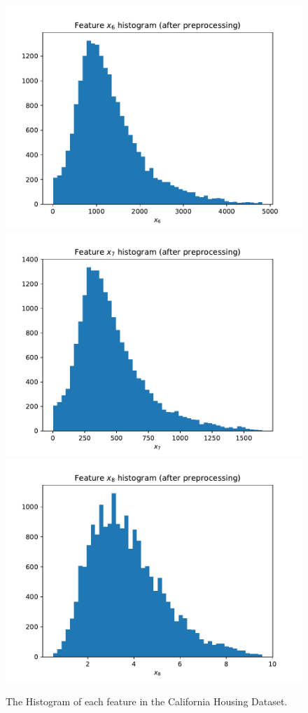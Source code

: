 \documentclass{article} %
\begin{document}
\begin{figure}[h]
  \includegraphics[width=.43\textwidth]{real_dataset_3/hist_feat_6_after}\\
  \includegraphics[width=.43\textwidth]{real_dataset_3/hist_feat_7_after}
  \includegraphics[width=.43\textwidth]{real_dataset_3/hist_feat_8_after}\\
  \caption{The Histogram of each feature in the California Housing Dataset.}
  \label{fig:feature-histograms}
\end{figure}
\end{document}
